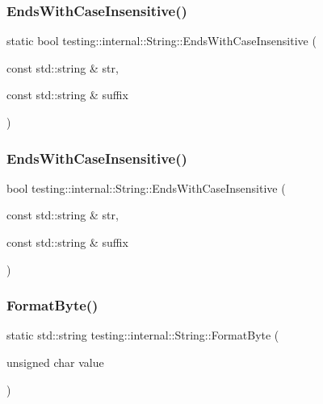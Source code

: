 \subsubsection{\texorpdfstring{EndsWithCaseInsensitive()}{EndsWithCaseInsensitive()}\hspace{0.1cm}{\footnotesize\ttfamily [2/3]}}
{\footnotesize\ttfamily static bool testing\+::internal\+::\+String\+::\+Ends\+With\+Case\+Insensitive (\begin{DoxyParamCaption}\item[{const std\+::string \&}]{str,  }\item[{const std\+::string \&}]{suffix }\end{DoxyParamCaption})\hspace{0.3cm}{\ttfamily [static]}}

\mbox{\label{classtesting_1_1internal_1_1_string_a968f242b709f8c7c0ed5ecf246553321}} 
\subsubsection{\texorpdfstring{EndsWithCaseInsensitive()}{EndsWithCaseInsensitive()}\hspace{0.1cm}{\footnotesize\ttfamily [3/3]}}
{\footnotesize\ttfamily bool testing\+::internal\+::\+String\+::\+Ends\+With\+Case\+Insensitive (\begin{DoxyParamCaption}\item[{const std\+::string \&}]{str,  }\item[{const std\+::string \&}]{suffix }\end{DoxyParamCaption})\hspace{0.3cm}{\ttfamily [static]}}

\mbox{\label{classtesting_1_1internal_1_1_string_ab3555eeb6abe4b7c6f63d865af10379d}} 
\subsubsection{\texorpdfstring{FormatByte()}{FormatByte()}\hspace{0.1cm}{\footnotesize\ttfamily [1/3]}}
{\footnotesize\ttfamily static std\+::string testing\+::internal\+::\+String\+::\+Format\+Byte (\begin{DoxyParamCaption}\item[{unsigned char}]{value }\end{DoxyParamCaption})\hspace{0.3cm}{\ttfamily [static]}}

